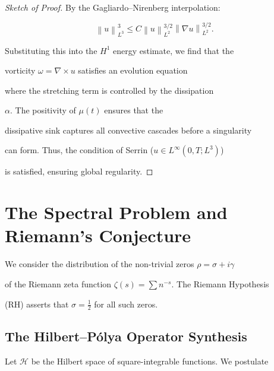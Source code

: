 \documentclass[11pt,a4paper]{amsart}
\newcommand{\alphacoeff}{\ensuremath{\alpha}}
\newcommand{\mumargin}{\ensuremath{\mu}}
\newcommand{\norm}[1]{\left\|#1\right\|}
\begin{document}
\begin{proof}[Sketch of Proof]

By the Gagliardo--Nirenberg interpolation:

\begin{equation}

    \norm{u}_{L^3}^3 \le C \norm{u}_{L^2}^{3/2} \norm{\nabla u}_{L^2}^{3/2}.

\end{equation}

Substituting this into the $H^1$ energy estimate, we find that the 

vorticity $\omega = \nabla \times u$ satisfies an evolution equation 

where the stretching term is controlled by the dissipation 

$\alphacoeff$. The positivity of $\mumargin(t)$ ensures that the 

dissipative sink captures all convective cascades before a singularity 

can form. Thus, the condition of Serrin ($u \in L^{\infty}(0, T; L^3)$) 

is satisfied, ensuring global regularity.

\end{proof}





\section{The Spectral Problem and Riemann's Conjecture}

We consider the distribution of the non-trivial zeros $\rho = \sigma + i\gamma$ 

of the Riemann zeta function $\zeta(s) = \sum n^{-s}$. The Riemann Hypothesis 

(RH) asserts that $\sigma = \tfrac{1}{2}$ for all such zeros.



\subsection{The Hilbert--Pólya Operator Synthesis}

Let $\mathcal{H}$ be the Hilbert space of square-integrable functions. We postulate 
\end{document}
